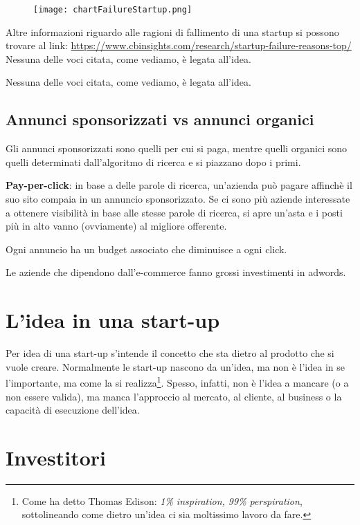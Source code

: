 \begin{figure}[H]
\texttt{[image: chartFailureStartup.png]}
\end{figure}

Altre informazioni riguardo alle ragioni di fallimento di una startup si possono
trovare al link: \url{https://www.cbinsights.com/research/startup-failure-reasons-top/}
Nessuna delle voci citata, come vediamo, è legata all'idea.

Nessuna delle voci citata, come vediamo, è legata all'idea.

\subsection{Annunci sponsorizzati vs annunci organici}

Gli annunci sponsorizzati sono quelli per cui si paga, mentre quelli organici sono
quelli determinati dall'algoritmo di ricerca e si piazzano dopo i primi.

\textbf{Pay-per-click}: in base a delle parole di ricerca, un'azienda può pagare
affinchè il suo sito compaia in un annuncio sponsorizzato. Se ci sono più aziende
interessate a ottenere visibilità in base alle stesse parole di ricerca, si apre
un'asta e i posti più in alto vanno (ovviamente) al migliore offerente.

Ogni annuncio ha un budget associato che diminuisce a ogni click.

Le aziende che dipendono dall'e-commerce fanno grossi investimenti in adwords.

\section{L'idea in una start-up}

Per idea di una start-up s'intende il concetto che sta dietro al prodotto che
si vuole creare. Normalmente le start-up nascono da un'idea, ma non è l'idea in
se l'importante, ma come la si realizza\footnote{Come ha detto Thomas Edison:
\emph{1\% inspiration, 99\% perspiration}, sottolineando come dietro un'idea
ci sia moltissimo lavoro da fare.}. Spesso, infatti, non è l'idea a mancare
(o a non essere valida), ma manca l'approccio al mercato, al cliente, al 
business o la capacità di esecuzione dell'idea.

\section{Investitori}

